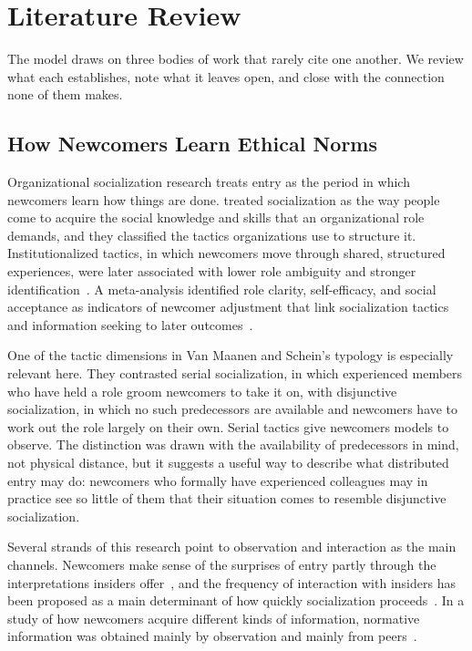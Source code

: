 \section{Literature Review}
The model draws on three bodies of work that rarely cite one another. We review what each establishes, note what it leaves open, and close with the connection none of them makes.

\subsection{How Newcomers Learn Ethical Norms}

Organizational socialization research treats entry as the period in which newcomers learn how things are done. \citet{vanmaanen1979toward} treated socialization as the way people come to acquire the social knowledge and skills that an organizational role demands, and they classified the tactics organizations use to structure it. Institutionalized tactics, in which newcomers move through shared, structured experiences, were later associated with lower role ambiguity and stronger identification~\citep{ashforth1996socialization}. A meta-analysis identified role clarity, self-efficacy, and social acceptance as indicators of newcomer adjustment that link socialization tactics and information seeking to later outcomes~\citep{bauer2007newcomer}.

One of the tactic dimensions in Van Maanen and Schein's typology is especially relevant here. They contrasted serial socialization, in which experienced members who have held a role groom newcomers to take it on, with disjunctive socialization, in which no such predecessors are available and newcomers have to work out the role largely on their own. Serial tactics give newcomers models to observe. The distinction was drawn with the availability of predecessors in mind, not physical distance, but it suggests a useful way to describe what distributed entry may do: newcomers who formally have experienced colleagues may in practice see so little of them that their situation comes to resemble disjunctive socialization.

Several strands of this research point to observation and interaction as the main channels. Newcomers make sense of the surprises of entry partly through the interpretations insiders offer~\citep{louis1980surprise}, and the frequency of interaction with insiders has been proposed as a main determinant of how quickly socialization proceeds~\citep{reichers1987interactionist}. In a study of how newcomers acquire different kinds of information, normative information was obtained mainly by observation and mainly from peers~\citep{morrison1993newcomer}.

